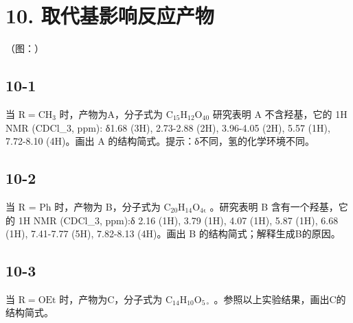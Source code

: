 \section*{10. 取代基影响反应产物}
（图：）

\subsection*{10-1}
当 $\mathrm { R = C H _ { 3 } }$ 时，产物为A，分⼦式为 $\mathrm { C _ { 1 5 } H _ { 1 2 } O _ { 4 0 } }$ 研究表明 A 不含羟基，它的 1H NMR (CDCl_{3}, ppm): δ1.68 (3H), 2.73-2.88 (2H), 3.96-4.05 (2H), 5.57 (1H), 7.72-8.10 (4H)。画出 A 的结构简式。提⽰：δ不同，氢的化学环境不同。

\subsection*{10-2}
当 R = Ph 时，产物为 B，分⼦式为 $\mathrm { C _ { 2 0 } H _ { 1 4 } O _ { 4 \epsilon } }$ 。研究表明 B 含有⼀个羟基，它的 1H NMR (CDCl_{3}, ppm):δ 2.16 (1H), 3.79 (1H), 4.07 (1H), 5.87 (1H), 6.68 (1H), 7.41-7.77 (5H), 7.82-8.13 (4H)。画出 B 的结构简式；解释⽣成B的原因。

\subsection*{10-3}
当 $\mathrm { R = O E t }$ 时，产物为C，分⼦式为 $\mathrm { C _ { 1 4 } H _ { 1 0 } O _ { 5 \circ } }$ 。参照以上实验结果，画出C的结构简式。
